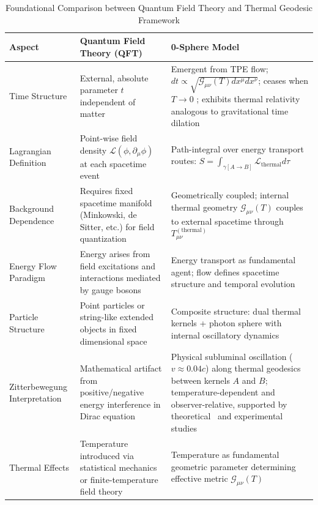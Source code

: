 \documentclass[%
 reprint,
 amsmath,amssymb,
 aps,
]{revtex4-1}
\numberwithin{equation}{section}%
\begin{document}
\begin{table}[!htbp] %
\caption{Foundational Comparison between Quantum Field Theory and Thermal Geodesic Framework}
\label{tab:comparison_qft_thermal}
\renewcommand{\arraystretch}{1.3}
\begin{tabular}{p{4.8cm}p{6.2cm}p{6.2cm}}
\toprule
\textbf{Aspect} & \textbf{Quantum Field Theory (QFT)} & \textbf{0-Sphere Model} \\
\midrule
Time Structure & External, absolute parameter $t$ independent of matter & Emergent from TPE flow; $dt \propto \sqrt{\mathcal{G}_{\mu\nu}(T) dx^\mu dx^\nu}$; ceases when $T \to 0$ ; exhibits thermal relativity analogous to gravitational time dilation\\
\addlinespace[0.3cm]
Lagrangian Definition & Point-wise field density $\mathcal{L}(\phi, \partial_\mu \phi)$ at each spacetime event & Path-integral over energy transport routes: $S = \int_{\gamma[A \to B]} \mathcal{L}_{\text{thermal}} d\tau$ \\
\addlinespace[0.3cm]
Background Dependence & Requires fixed spacetime manifold (Minkowski, de Sitter, etc.) for field quantization & Geometrically coupled; internal thermal geometry $\mathcal{G}_{\mu\nu}(T)$ couples to external spacetime through $T_{\mu\nu}^{(\text{thermal})}$ \\
\addlinespace[0.3cm]
Energy Flow Paradigm & Energy arises from field excitations and interactions mediated by gauge bosons & Energy transport as fundamental agent; flow defines spacetime structure and temporal evolution \\
\addlinespace[0.3cm]
Particle Structure & Point particles or string-like extended objects in fixed dimensional space & Composite structure: dual thermal kernels + photon sphere with internal oscillatory dynamics \\
\addlinespace[0.3cm]
Zitterbewegung Interpretation & Mathematical artifact from positive/negative energy interference in Dirac equation~\cite{dirac1928} & Physical subluminal oscillation ($v \approx 0.04c$) along thermal geodesics between kernels $A$ and $B$; temperature-dependent and observer-relative, supported by theoretical~\cite{hestenes1990} and experimental studies~\cite{gerritsma2010, leblanc2013} \\
\addlinespace[0.3cm]
Thermal Effects & Temperature introduced via statistical mechanics or finite-temperature field theory & Temperature as fundamental geometric parameter determining effective metric $\mathcal{G}_{\mu\nu}(T)$ \\

\end{tabular}
\end{table}
\end{document}
